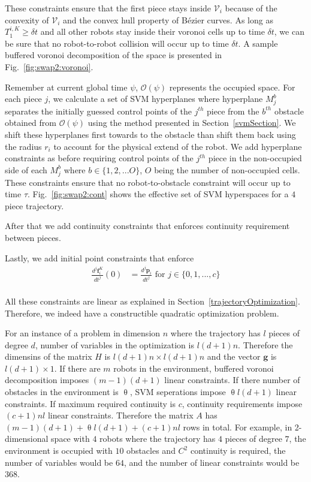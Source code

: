 \documentclass{svproc}
\newcommand{\vp}{\mathbf{p}}
\newcommand{\vg}{\mathbf{g}}
\newcommand{\vf}{\mathbf{f}}
\newcommand{\cV}{\mathcal{V}}
\newcommand{\cO}{\mathcal{O}}
\begin{document}
These constraints ensure that the first piece stays inside $\cV_i$ because of the convexity of $\cV_i$ and the convex hull property of B\'ezier curves. As long as $T^{i,K}_1 \geq \delta t$ and all other robots stay inside their voronoi cells up to time $\delta t$, we can be sure that no robot-to-robot collision will occur up to time $\delta t$. A sample buffered voronoi decomposition of the space is presented in Fig.~\ref{fig:swap2:voronoi}.

Remember at current global time $\psi$, $\cO(\psi)$ represents the occupied space. For each piece $j$, we calculate a set of SVM hyperplanes where hyperplane $M_j^b$ separates the initially guessed control points of the $j^{th}$ piece from the $b^{th}$ obstacle obtained from $\cO(\psi)$ using the method presented in Section~\ref{svmSection}. We shift these hyperplanes first towards to the obstacle than shift them back using the radius $r_i$ to account for the physical extend of the robot. We add hyperplane constraints as before requiring control points of the $j^{th}$ piece in the non-occupied side of each $M_j^b$ where $b\in \{1,2,...O\}$, $O$ being the number of non-occupied cells. These constraints ensure that no robot-to-obstacle constraint will occur up to time $\tau$. Fig.~\ref{fig:swap2:cont} shows the effective set of SVM hyperspaces for a $4$ piece trajectory.

After that we add continuity constraints that enforces continuity requirement between pieces.

Lastly, we add initial point constraints that enforce 
\begin{align*}
\frac{d^j\vf^{K}_i}{dt^j}(0) &= \frac{d^j\vp_i}{dt^j}\text{ for } j\in\{0,1,...,c\}\\
\end{align*}

All these constraints are linear as explained in Section~\ref{trajectoryOptimization}. Therefore, we indeed have a constructible quadratic optimization problem.

For an instance of a problem in dimension $n$ where the trajectory has $l$ pieces of degree $d$, number of variables in the optimization is $l(d+1)n$. Therefore the dimensins of the matrix $H$ is $l(d+1)n\times l(d+1)n$ and the vector $\vg$ is $l(d+1)\times 1$. If there are $m$ robots in the environment, buffered voronoi decomposition imposes $(m-1)(d+1)$ linear constraints. If there number of obstacles in the environment is $\uptheta$, SVM seperations impose $\uptheta l (d+1)$ linear constraints. If maximum required continuity is $c$, continuity requirements impose $(c+1)nl$ linear constraints. Therefore the matrix $A$ has $(m-1)(d+1) + \uptheta l(d+1) + (c+1)nl$ rows in total. For example, in 2-dimensional space with $4$ robots where the trajectory has $4$ pieces of degree $7$, the environment is occupied with $10$ obstacles and $C^{2}$ continuity is required, the number of variables would be $64$, and the number of linear constraints would be $368$.
\end{document}
